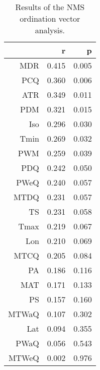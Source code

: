 \begin{table}[ht]
\centering
\begin{tabular}{rrr}
  \hline
 & r & p \\ 
  \hline
MDR & 0.415 & 0.005 \\ 
  PCQ & 0.360 & 0.006 \\ 
  ATR & 0.349 & 0.011 \\ 
  PDM & 0.321 & 0.015 \\ 
  Iso & 0.296 & 0.030 \\ 
  Tmin & 0.269 & 0.032 \\ 
  PWM & 0.259 & 0.039 \\ 
  PDQ & 0.242 & 0.050 \\ 
  PWeQ & 0.240 & 0.057 \\ 
  MTDQ & 0.231 & 0.057 \\ 
  TS & 0.231 & 0.058 \\ 
  Tmax & 0.219 & 0.067 \\ 
  Lon & 0.210 & 0.069 \\ 
  MTCQ & 0.205 & 0.084 \\ 
  PA & 0.186 & 0.116 \\ 
  MAT & 0.171 & 0.133 \\ 
  PS & 0.157 & 0.160 \\ 
  MTWaQ & 0.107 & 0.302 \\ 
  Lat & 0.094 & 0.355 \\ 
  PWaQ & 0.056 & 0.543 \\ 
  MTWeQ & 0.002 & 0.976 \\ 
   \hline
\end{tabular}
\caption{Results of the NMS ordination vector analysis.} 
\end{table}
